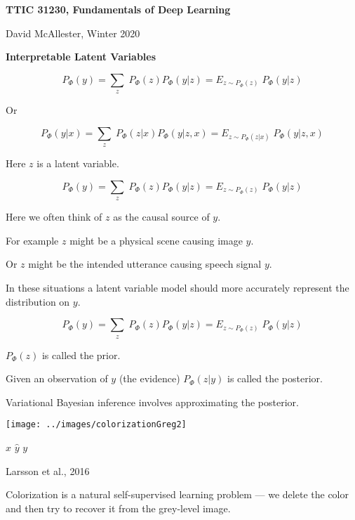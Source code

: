 





{\Huge

  \centerline{\bf TTIC 31230, Fundamentals of Deep Learning}
  \bigskip
  \centerline{David McAllester, Winter 2020}
  \vfill
  \vfil
  \centerline{\bf Interpretable Latent Variables}
  \vfill
  \vfill


{\color{red} $$P_\Phi(y) = \sum_z\;P_\Phi(z)P_\Phi(y|z) = E_{z \sim P_\Phi(z)}\;P_\Phi(y|z)$$}

Or

\vfill
{\color{red} $$P_\Phi(y|x) = \sum_z\;P_\Phi(z|x)P_\Phi(y|z,x) = E_{z \sim P_\Phi(z|x)}\;P_\Phi(y|z,x)$$}

\vfill
Here {\color{red} $z$} is a latent variable.


{\color{red} $$P_\Phi(y) = \sum_z\;P_\Phi(z)P_\Phi(y|z) = E_{z \sim P_\Phi(z)}\;P_\Phi(y|z)$$}

Here we often think of $z$ as the causal source of $y$.

\vfill
For example $z$ might be a physical scene causing image $y$.

\vfill
Or $z$ might be the intended utterance causing speech signal $y$.

\vfill
In these situations a latent variable model should more accurately represent the distribution on $y$.


{\color{red} $$P_\Phi(y) = \sum_z\;P_\Phi(z)P_\Phi(y|z) = E_{z \sim P_\Phi(z)}\;P_\Phi(y|z)$$}

\vfill
$P_\Phi(z)$ is called the prior.

\vfill
Given an observation of $y$ (the evidence) $P_\Phi(z|y)$ is called the posterior.

\vfill
Variational Bayesian inference involves approximating the posterior.

\medskip
\centerline{\texttt{[image: ../images/colorizationGreg2]}}
\centerline{$x$ \hspace{4em} $\hat{y}$ \hspace{4em} $y$}
\centerline{\huge Larsson et al., 2016}

\vfill
Colorization is a natural self-supervised learning problem --- we delete the color and then try to recover it from the grey-level image.

}
